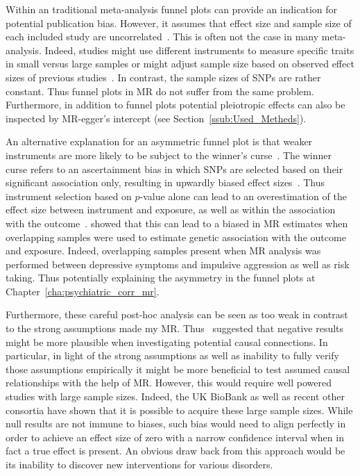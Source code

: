 Within an traditional meta-analysis funnel plots can provide an indication for potential publication bias.
However, it assumes that effect size and sample size of each included study are uncorrelated~\cite{Evans2013}.
This is often not the case in many meta-analysis.
Indeed, studies might use different instruments to measure specific traits in small versus large samples or  might adjust sample size based on observed effect sizes of previous studies~\cite{Simonsohn}.
In contrast, the sample sizes of SNPs are rather constant.
Thus funnel plots in MR do not suffer from the same problem.
Furthermore, in addition to funnel plots potential pleiotropic effects can also be inspected by MR-egger's intercept (see Section~\ref{ssub:Used_Metheds}).

An alternative explanation for an asymmetric funnel plot is that weaker instruments are more likely to be subject to the winner's curse~\cite{Taylor2014}.
The winner curse refers to an ascertainment bias in which SNPs are selected based on their significant association only, resulting in upwardly biased effect sizes~\cite{Xiao2008}.
Thus instrument selection based on $p$-value alone can lead to an overestimation of the effect size between instrument and exposure, as well as within the association with the outcome~\cite{Bowden2015a}.
\citet{Taylor2014} showed that this can lead to a biased in MR estimates when overlapping samples were used to estimate genetic association with the outcome and exposure.
Indeed, overlapping samples present when MR analysis was performed between depressive symptoms and impulsive aggression as well as risk taking.
Thus potentially explaining the asymmetry in the funnel plots at Chapter~\ref{cha:psychiatric_corr_mr}.

Furthermore, these careful post-hoc analysis can be seen as too weak in contrast to the strong assumptions made my MR\@. 
Thus~\citet{Vanderweele2015} suggested that negative results might be more plausible when investigating potential causal connections.
In particular, in light of the strong assumptions as well as inability to fully verify those assumptions empirically it might be more beneficial to test assumed causal relationships with the help of MR\@.
However, this would require well powered studies with large sample sizes.
Indeed, the UK BioBank as well as recent other consortia have shown that it is possible to acquire these large sample sizes.
While null results are not immune to biases, such bias would need to align perfectly in order to achieve an effect size of zero with a narrow confidence interval when in fact a true effect is present.
An obvious draw back from this approach would be its inability to discover new interventions for various disorders. 

